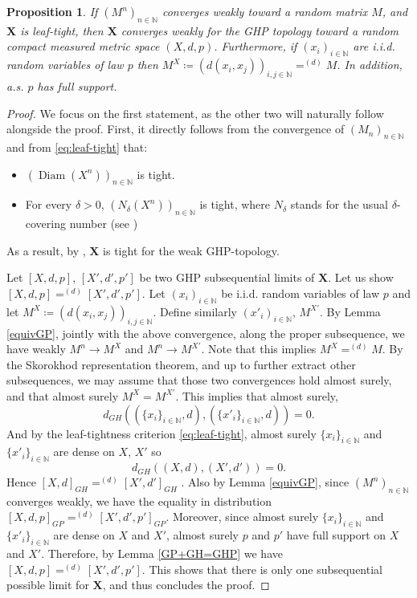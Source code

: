 \documentclass[11pt]{article}
\theoremstyle{plain}
\newtheorem{proposition}[theorem]{Proposition}
\theoremstyle{definition}
\theoremstyle{remark}
\newcommand{\N}{\mathbb{N}} %
\newcommand{\1}{\mathbbm{1}} %
\DeclareMathOperator*{\limit}{\longrightarrow}
\DeclareMathOperator*{\diam}{Diam}
\begin{document}
\begin{proposition}
\label{C.1}
If $(M^n)_{n\in \N}$ converges weakly toward a random matrix $M$, and $\mathbf X$ is leaf-tight, then $\mathbf X$ converges weakly for the GHP topology toward a random compact measured metric space $(X,d,p)$. Furthermore, if $(x_i)_{i\in \N}$ are i.i.d. random variables of law $p$ then $M^X\coloneqq(d(x_i,x_j))_{i,j\in \N}=^{(d)} M$. In addition, a.s. $p$  has full support.
 \end{proposition}
 
\begin{proof}
We focus on the first statement, as the other two will naturally follow alongside the proof. First, it directly follows from the convergence of $(M_n)_{n\in \N}$ and from \eqref{eq:leaf-tight} that: 
\begin{itemize}
\item $(\diam(X^n))_{n\in \N}$ is tight. 
\item For every $\delta>0$, $(N_\delta(X^n))_{n\in \N}$ is tight, where $N_\delta$ stands for the usual  $\delta$-covering number (see \cite{ADH13})
\end{itemize}
As a result, by \cite[Theorem 2.4]{ADH13}, $\mathbf X$ is tight for the weak GHP-topology.

Let $[X,d,p]$, $[X',d',p']$ be two GHP subsequential limits of $\mathbf X$. Let us show $[X,d,p]=^{(d)}[X',d',p']$. 
  Let $(x_i)_{i\in \N}$ be i.i.d. random variables of law $p$ and let $M^X\coloneqq(d(x_i,x_j))_{i,j\in \N}$. Define similarly $(x'_i)_{i\in \N}$,  $M^{X'}$. By Lemma
\ref{equivGP}, jointly with the above convergence,  along the proper subsequence, we have weakly $M^n\limit M^X$ and $M^n\limit M^{X'}$. Note that this implies $M^X=^{(d)} M$. By the Skorokhod representation theorem, and up to further extract other subsequences, we may assume that those two convergences hold almost surely, and that almost surely $M^X=M^{X'}$. This implies that almost surely,
\[ d_{GH}((\{x_i\}_{i\in \N},d),(\{x'_i\}_{i\in \N},d)) =0. \]
And by the leaf-tightness criterion \eqref{eq:leaf-tight}, almost surely $\{x_i\}_{i\in \N}$ and $\{x'_i\}_{i\in \N}$ are dense on $X$, $X'$ so 
\[ d_{GH}((X,d),(X',d')) =0. \]
Hence $[X,d]_{GH}=^{(d)}[X',d']_{GH}$ . Also by Lemma \ref{equivGP}, since $(M^n)_{n\in \N}$ converges weakly, we have the equality in distribution $[X,d,p]_{GP}=^{(d)}[X',d',p']_{GP}$. Moreover, since almost surely $\{x_i\}_{i\in \N}$ and $\{x'_i\}_{i\in \N}$ are dense on $X$ and $X'$, almost surely $p$ and $p'$ have full support on $X$ and $X'$. Therefore, by Lemma \ref{GP+GH=GHP} we have $[X,d,p]=^{(d)}[X',d',p']$. This shows that there is only one subsequential possible limit for $\mathbf X$, and thus concludes the proof.
\end{proof}
\end{document}
